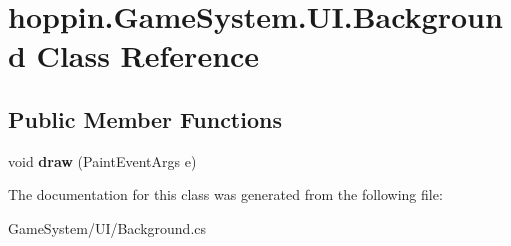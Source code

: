 \hypertarget{classhoppin_1_1_game_system_1_1_u_i_1_1_background}{}\section{hoppin.\+Game\+System.\+U\+I.\+Background Class Reference}
\label{classhoppin_1_1_game_system_1_1_u_i_1_1_background}
\subsection*{Public Member Functions}
\begin{DoxyCompactItemize}
\item 
void {\bfseries draw} (Paint\+Event\+Args e)\hypertarget{classhoppin_1_1_game_system_1_1_u_i_1_1_background_ac3184f74ee57490c21ea6a3dab447608}{}\label{classhoppin_1_1_game_system_1_1_u_i_1_1_background_ac3184f74ee57490c21ea6a3dab447608}

\end{DoxyCompactItemize}


The documentation for this class was generated from the following file\+:\begin{DoxyCompactItemize}
\item 
Game\+System/\+U\+I/Background.\+cs\end{DoxyCompactItemize}
